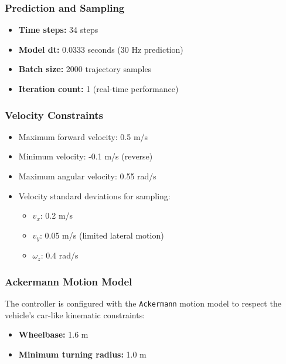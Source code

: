 \subsubsection{Prediction and Sampling}
\begin{itemize}
    \item \textbf{Time steps:} 34 steps
    \item \textbf{Model dt:} 0.0333 seconds (30 Hz prediction)
    \item \textbf{Batch size:} 2000 trajectory samples
    \item \textbf{Iteration count:} 1 (real-time performance)
\end{itemize}

\subsubsection{Velocity Constraints}
\begin{itemize}
    \item Maximum forward velocity: 0.5 m/s
    \item Minimum velocity: -0.1 m/s (reverse)
    \item Maximum angular velocity: 0.55 rad/s
    \item Velocity standard deviations for sampling:
    \begin{itemize}
        \item $v_x$: 0.2 m/s
        \item $v_y$: 0.05 m/s (limited lateral motion)
        \item $\omega_z$: 0.4 rad/s
    \end{itemize}
\end{itemize}

\subsubsection{Ackermann Motion Model}
The controller is configured with the \texttt{Ackermann} motion model to respect the vehicle's car-like kinematic constraints:
\begin{itemize}
    \item \textbf{Wheelbase:} 1.6 m
    \item \textbf{Minimum turning radius:} 1.0 m
\end{itemize}

